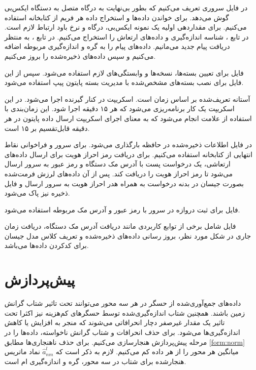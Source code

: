 در فایل  سروری تعریف می‌کنیم که بطور بی‌نهایت به درگاه  متصل به دستگاه ایکس‌بی گوش می‌دهد. برای خواندن داده‌ها و استخراج داده هر فریم از کتابخانه  استفاده می‌کنیم. برای مقداردهی اولیه یک نمونه ایکس‌بی، درگاه و نرخ باود ارتباط لازم است. در تابع ، شناسه اندازه‌گیری و داده‌های ارتعاش را استخراج می‌کنیم. در تابع ، به منتظر دریافت پیام جدید می‌مانیم. داده‌های پیام را به گره و اندازه‌گیری مربوطه اضافه می‌کنیم و سپس داده‌های ذخیره‌شده را بروز می‌کنیم.


فایل  برای تعیین بسته‌ها، نسخه‌ها و وابستگی‌های لازم استفاده می‌شود. سپس از این فایل برای نصب بسته‌های مشخص‌شده با مدیریت بسته پایتون پیپ استفاده می‌شود.


آستانه تعریف‌شده بر اساس زمان است. اسکریپت  در کنار گیرنده اجرا می‌شود. در این اسکریپت یک کار  برنامه‌ریزی می‌شود که هر ۱۵ دقیقه اجرا شود. این زمان‌بندی با استفاده از علامت  انجام می‌شود که به معنای اجرای اسکریپت ارسال داده پایتون در هر دقیقه قابل‌تقسیم بر ۱۵ است.


در فایل  اطلاعات ذخیره‌شده در حافظه بارگذاری می‌شود. برای سرور و فراخوانی نقاط انتهایی  از کتابخانه  استفاده می‌کنیم. برای دریافت رمز احراز هویت  برای ارسال داده‌های ارتعاشی، یک درخواست پست با آدرس مک دستگاه و رمز عبور به سرور ارسال می‌شود تا رمز احراز هویت را دریافت کند. پس از آن داده‌های لرزش فرمت‌شده بصورت جیسان در بدنه درخواست به همراه هدر احراز هویت به سرور ارسال و فایل ذخیره نیز پاک می‌شود.


فایل  برای ثبت دروازه در سرور با رمز عبور و آدرس مک مربوطه استفاده می‌شود.


فایل  شامل برخی از توابع کاربردی مانند دریافت آدرس مک دستگاه، دریافت زمان جاری در شکل مورد نظر، بروز رسانی داده‌های ذخیره‌شده و تعریف کلاس مدل جیسان برای کد‌کردن داده‌ها می‌باشد.

\section{پیش‌پردازش}

داده‌های جمع‌آوری‌شده از حسگر در هر سه محور می‌توانند تحت تاثیر شتاب گرانش زمین باشند. همچنین شتاب اندازه‌گیری‌شده توسط حسگرهای کم‌هزینه  نیز اکثرا تحت تاثیر یک مقدار غیرصفر دچار انحرافاتی می‌شوند که منجر به افزایش یا کاهش اندازه‌گیری‌ها می‌شود\cite{jung2017vibration}. برای حذف انحرافات و شتاب گرانش ناخواسته، داده‌ها را در مرحله پیش‌پردازش هنجارسازی می‌کنیم. برای حذف ناهنجاری‌ها مطابق \cref{form:norm} میانگین هر محور را از هر داده کم می‌کنیم. لازم به ذکر است که $\hat{a}^l_{nm}$ نماد ماتریس هنجارشده برای شتاب در سه محور، گره  و اندازه‌گیری ام است.

